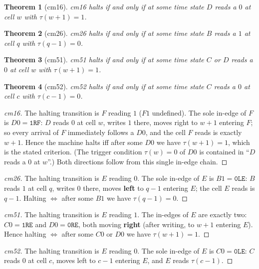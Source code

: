 \documentclass[11pt]{amsart}
\newtheorem{theorem}{Theorem}[section]
\begin{document}
\begin{theorem}[cm16]\label{thm:h16}
cm16 halts if and only if at some time state $D$ reads a $0$ at cell $w$ with $\tau(w{+}1)=1$.
\end{theorem}
\begin{theorem}[cm26]\label{thm:h26}
cm26 halts if and only if at some time state $B$ reads a $1$ at cell $q$ with $\tau(q{-}1)=0$.
\end{theorem}
\begin{theorem}[cm51]\label{thm:h51}
cm51 halts if and only if at some time state $C$ or $D$ reads a $0$ at cell $w$ with $\tau(w{+}1)=1$.
\end{theorem}
\begin{theorem}[cm52]\label{thm:h52}
cm52 halts if and only if at some time state $C$ reads a $0$ at cell $c$ with $\tau(c{-}1)=0$.
\end{theorem}

\begin{proof}[cm16]
The halting transition is $F$ reading $1$ ($F1$ undefined). The sole in-edge of $F$ is $D0=\texttt{1RF}$: $D$ reads $0$ at cell $w$, writes $1$ there, moves right to $w{+}1$ entering $F$; so every arrival of $F$ immediately follows a $D0$, and the cell $F$ reads is exactly $w{+}1$. Hence the machine halts iff after some $D0$ we have $\tau(w{+}1)=1$, which is the stated criterion. (The trigger condition $\tau(w)=0$ of $D0$ is contained in ``$D$ reads a $0$ at $w$''.) Both directions follow from this single in-edge chain.
\end{proof}

\begin{proof}[cm26]
The halting transition is $E$ reading $0$. The sole in-edge of $E$ is $B1=\texttt{0LE}$: $B$ reads $1$ at cell $q$, writes $0$ there, moves \textbf{left} to $q{-}1$ entering $E$; the cell $E$ reads is $q{-}1$. Halting $\iff$ after some $B1$ we have $\tau(q{-}1)=0$.
\end{proof}

\begin{proof}[cm51]
The halting transition is $E$ reading $1$. The in-edges of $E$ are exactly two: $C0=\texttt{1RE}$ and $D0=\texttt{0RE}$, both moving \textbf{right} (after writing, to $w{+}1$ entering $E$). Hence halting $\iff$ after some $C0$ or $D0$ we have $\tau(w{+}1)=1$.
\end{proof}

\begin{proof}[cm52]
The halting transition is $E$ reading $0$. The sole in-edge of $E$ is $C0=\texttt{0LE}$: $C$ reads $0$ at cell $c$, moves left to $c{-}1$ entering $E$, and $E$ reads $\tau(c{-}1)$.
\end{proof}
\end{document}
